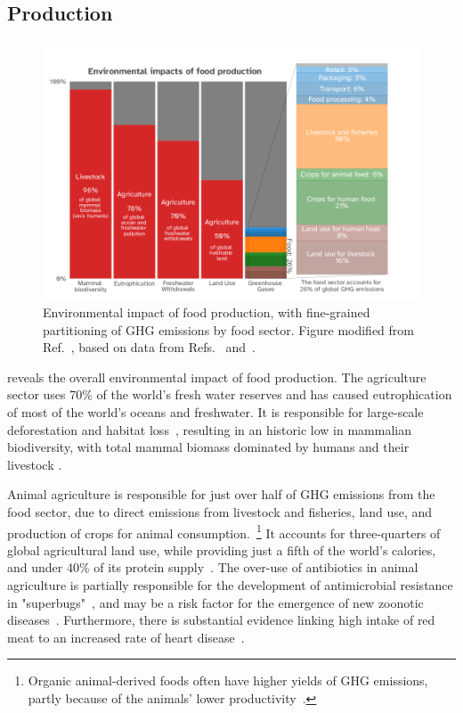 \documentclass[../SustainableHEP.tex]{subfiles}
\begin{document}
\newpage
\subsection{Production\label{sec:agriculture}}

\begin{figure}
    \centering
    \includegraphics[width=\textwidth]{Sections/Figs/Food/FoodEnvironment.png}
    \caption[Environmental impact of food production]{ Environmental impact of food production, with fine-grained partitioning of GHG emissions by food sector. Figure modified from Ref.~\cite{OWID-Food}, based on data from Refs.~\cite{PooreNemecek2018} and~\cite{Bar-On6506}.
    \label{fig:food_impact}}
\end{figure}

 reveals the overall environmental impact of food production.  The agriculture sector uses 70\% of the world's fresh water reserves and has caused eutrophication of most of the world's oceans and freshwater.  It is responsible for large-scale deforestation and habitat loss~\cite{OWID-Food, PooreNemecek2018, Xu2021}, resulting in an historic low in mammalian biodiversity, with total mammal biomass dominated by humans and their livestock \cite{Bar-On6506}. 

Animal agriculture is responsible for just over half  of GHG emissions from the food sector, due to direct emissions from livestock and fisheries, land use, and production of crops for animal consumption.~\footnote{Organic animal-derived foods often have higher yields of GHG emissions, partly because of the animals' lower productivity~\cite{Pieper2020}.}  It accounts for three-quarters of global agricultural land use, while providing just a fifth of the world's calories, and under 40\% of its protein supply~\cite{OWID-Food, PooreNemecek2018, Xu2021}.  The over-use of antibiotics in animal agriculture is partially responsible for the development of antimicrobial resistance in "superbugs"~\cite{AMBR2005}, and may be a risk factor for the emergence of new zoonotic diseases~\cite{Jones8399, Espinosa, Morand}.  Furthermore, there is substantial evidence linking high intake of red meat to an increased rate of heart disease~\cite{meat-health}.
\end{document}
